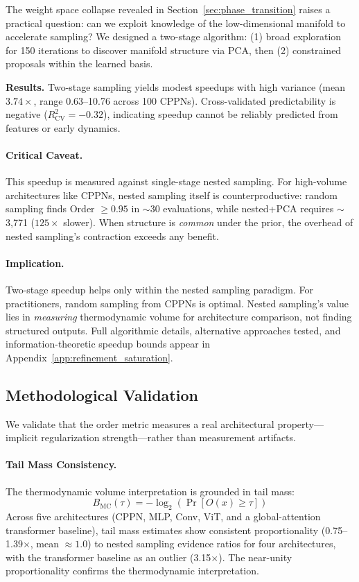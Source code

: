 \documentclass{article}
\begin{document}
The weight space collapse revealed in Section~\ref{sec:phase_transition} raises a practical question: can we exploit knowledge of the low-dimensional manifold to accelerate sampling? We designed a two-stage algorithm: (1) broad exploration for 150 iterations to discover manifold structure via PCA, then (2) constrained proposals within the learned basis.

\textbf{Results.} Two-stage sampling yields modest speedups with high variance (mean $3.74\times$, range 0.63--10.76 across 100 CPPNs). Cross-validated predictability is negative ($R^2_{\text{CV}}=-0.32$), indicating speedup cannot be reliably predicted from features or early dynamics.

\paragraph{Critical Caveat.} This speedup is measured against single-stage nested sampling. For high-volume architectures like CPPNs, nested sampling itself is counterproductive: random sampling finds Order $\geq 0.95$ in $\sim$30 evaluations, while nested+PCA requires $\sim$3,771 ($125\times$ slower). When structure is \emph{common} under the prior, the overhead of nested sampling's contraction exceeds any benefit.

\paragraph{Implication.} Two-stage speedup helps only within the nested sampling paradigm. For practitioners, random sampling from CPPNs is optimal. Nested sampling's value lies in \emph{measuring} thermodynamic volume for architecture comparison, not finding structured outputs. Full algorithmic details, alternative approaches tested, and information-theoretic speedup bounds appear in Appendix~\ref{app:refinement_saturation}.

\subsection{Methodological Validation}
\label{sec:methodological_validation}

We validate that the order metric measures a real architectural property---implicit regularization strength---rather than measurement artifacts.

\paragraph{Tail Mass Consistency.} The thermodynamic volume interpretation is grounded in tail mass:
\begin{equation}
B_{\text{MC}}(\tau) = -\log_2\left(\Pr[O(x) \geq \tau]\right)
\end{equation}
Across five architectures (CPPN, MLP, Conv, ViT, and a global-attention transformer baseline), tail mass estimates show consistent proportionality (0.75--1.39$\times$, mean $\approx 1.0$) to nested sampling evidence ratios for four architectures, with the transformer baseline as an outlier (3.15$\times$). The near-unity proportionality confirms the thermodynamic interpretation.
\end{document}
